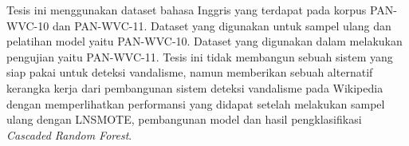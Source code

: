 Tesis ini menggunakan dataset bahasa Inggris yang terdapat pada korpus
PAN-WVC-10 dan PAN-WVC-11.
Dataset yang digunakan untuk sampel ulang dan pelatihan model yaitu PAN-WVC-10.
Dataset yang digunakan dalam melakukan pengujian yaitu PAN-WVC-11.
Tesis ini tidak membangun sebuah sistem yang siap pakai untuk deteksi
vandalisme, namun memberikan sebuah alternatif kerangka kerja dari pembangunan
sistem deteksi vandalisme pada Wikipedia dengan memperlihatkan performansi yang
didapat setelah melakukan sampel ulang dengan LNSMOTE, pembangunan model
dan hasil pengklasifikasi \textit{Cascaded Random Forest}.
